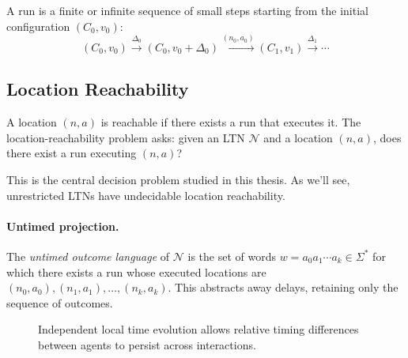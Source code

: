 \begin{definition}[Run]
A \textsf{run} is a finite or infinite sequence of small steps starting from the initial configuration $(C_0, v_0)$:
\[
(C_0, v_0) \xrightarrow{\Delta_0} (C_0, v_0 + \Delta_0) \xrightarrow{(n_0, a_0)} (C_1, v_1) \xrightarrow{\Delta_1} \cdots
\]
\end{definition}

\subsection{Location Reachability}

\begin{definition}
\label{def:location-reachability}
A location $(n, a)$ is \textsf{reachable} if there exists a run that executes it. The \textsf{location-reachability problem} asks: given an LTN $\mathcal{N}$ and a location $(n, a)$, does there exist a run executing $(n, a)$?
\end{definition}

This is the central decision problem studied in this thesis. As we'll see, unrestricted LTNs have undecidable location reachability.

\paragraph{Untimed projection.} The \emph{untimed outcome language} of $\mathcal{N}$ is the set of words $w = a_0 a_1 \cdots a_k \in \Sigma^*$ for which there exists a run whose executed locations are $(n_0, a_0), (n_1, a_1), \ldots, (n_k, a_k)$. This abstracts away delays, retaining only the sequence of outcomes.

\begin{figure}[t]
\centering
{}
\caption{Independent local time evolution allows relative timing differences
between agents to persist across interactions.}
\label{fig:persistent-drift}
\end{figure}

